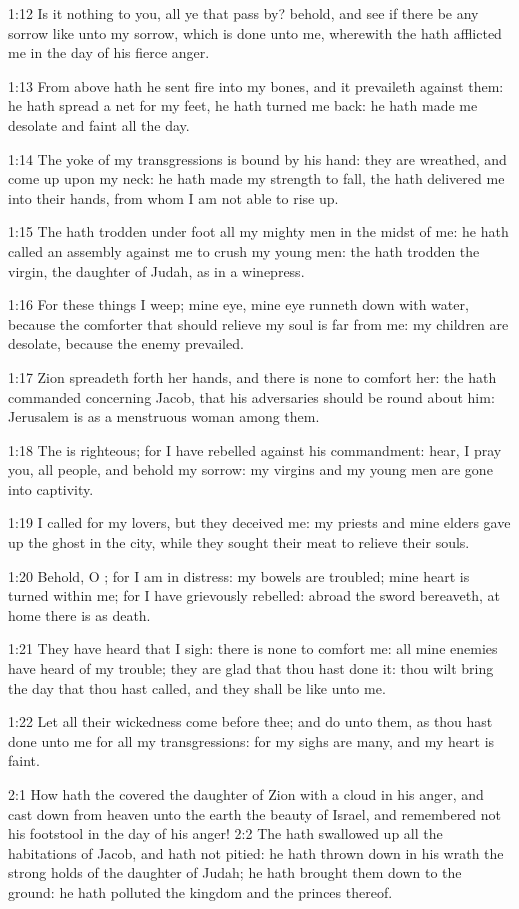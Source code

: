 1:12 Is it nothing to you, all ye that pass by? behold, and see if
there be any sorrow like unto my sorrow, which is done unto me,
wherewith the \LORD hath afflicted me in the day of his fierce anger.

1:13 From above hath he sent fire into my bones, and it prevaileth
against them: he hath spread a net for my feet, he hath turned me
back: he hath made me desolate and faint all the day.

1:14 The yoke of my transgressions is bound by his hand: they are
wreathed, and come up upon my neck: he hath made my strength to fall,
the \LORD hath delivered me into their hands, from whom I am not able
to rise up.

1:15 The \LORD hath trodden under foot all my mighty men in the midst
of me: he hath called an assembly against me to crush my young men:
the \LORD hath trodden the virgin, the daughter of Judah, as in a
winepress.

1:16 For these things I weep; mine eye, mine eye runneth down with
water, because the comforter that should relieve my soul is far from
me: my children are desolate, because the enemy prevailed.

1:17 Zion spreadeth forth her hands, and there is none to comfort her:
the \LORD hath commanded concerning Jacob, that his adversaries should
be round about him: Jerusalem is as a menstruous woman among them.

1:18 The \LORD is righteous; for I have rebelled against his
commandment: hear, I pray you, all people, and behold my sorrow: my
virgins and my young men are gone into captivity.

1:19 I called for my lovers, but they deceived me: my priests and mine
elders gave up the ghost in the city, while they sought their meat to
relieve their souls.

1:20 Behold, O \LORD; for I am in distress: my bowels are troubled;
mine heart is turned within me; for I have grievously rebelled: abroad
the sword bereaveth, at home there is as death.

1:21 They have heard that I sigh: there is none to comfort me: all
mine enemies have heard of my trouble; they are glad that thou hast
done it: thou wilt bring the day that thou hast called, and they shall
be like unto me.

1:22 Let all their wickedness come before thee; and do unto them, as
thou hast done unto me for all my transgressions: for my sighs are
many, and my heart is faint.

2:1 How hath the \LORD covered the daughter of Zion with a cloud in his
anger, and cast down from heaven unto the earth the beauty of Israel,
and remembered not his footstool in the day of his anger!  2:2 The
\LORD hath swallowed up all the habitations of Jacob, and hath not
pitied: he hath thrown down in his wrath the strong holds of the
daughter of Judah; he hath brought them down to the ground: he hath
polluted the kingdom and the princes thereof.

